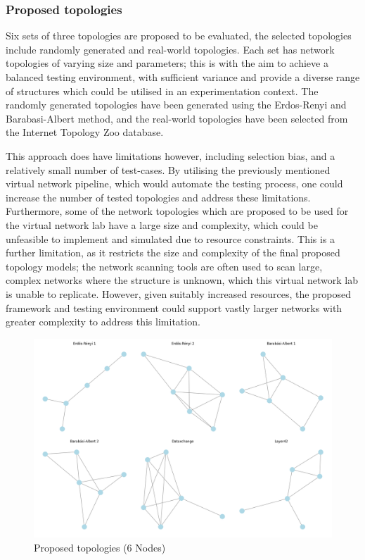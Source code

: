\newpage

\subsubsection{Proposed topologies}
Six sets of three topologies are proposed to be evaluated, the selected topologies include randomly generated and real-world topologies. Each set has network topologies of varying size and parameters; this is with the aim to achieve a balanced testing environment, with sufficient variance and provide a diverse range of structures which could be utilised in an experimentation context. The randomly generated topologies have been generated using the Erdos-Renyi and Barabasi-Albert method, and the real-world topologies have been selected from the Internet Topology Zoo database. 

This approach does have limitations however, including selection bias, and a relatively small number of test-cases. By utilising the previously mentioned virtual network pipeline, which would automate the testing process, one could increase the number of tested topologies and address these limitations. Furthermore, some of the network topologies which are proposed to be used for the virtual network lab have a large size and complexity, which could be unfeasible to implement and simulated due to resource constraints. 
This is a further limitation, as it restricts the size and complexity of the final proposed topology models; the network scanning tools are often used to scan large, complex networks where the structure is unknown, which this virtual network lab is unable to replicate. However, given suitably increased resources, the proposed framework and testing environment could support vastly larger networks with greater complexity to address this limitation. 

\begin{figure}
    \centering
    \includegraphics[width=0.8\linewidth]{images/Topology set/6.png}
    \caption{Proposed topologies (6 Nodes)}
    \label{fig:6_prop}
\end{figure}


